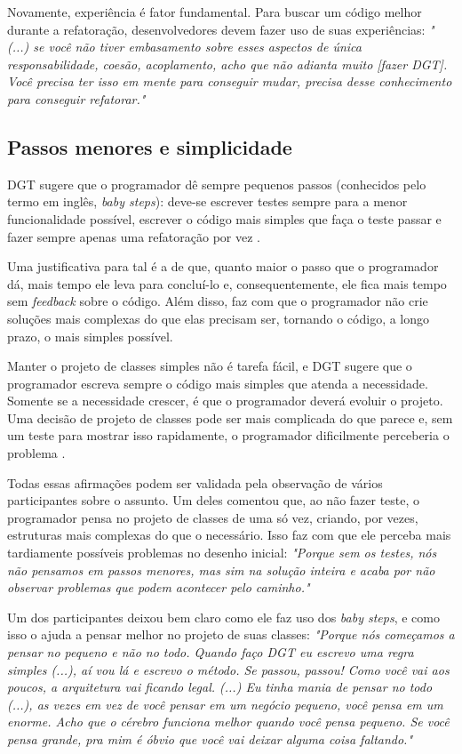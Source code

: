 Novamente, experiência é fator fundamental. Para buscar um código melhor durante a refatoração,
desenvolvedores devem fazer uso de suas experiências:
\textit{"(...) se você não tiver embasamento sobre esses aspectos de única responsabilidade,
coesão, acoplamento, acho que não adianta muito [fazer DGT]. Você precisa ter isso em mente
para conseguir mudar, precisa desse conhecimento para conseguir refatorar."}

\subsection{Passos menores e simplicidade}

DGT sugere que o programador dê sempre pequenos passos (conhecidos pelo termo em
inglês, \textit{baby steps}): deve-se escrever testes sempre para a menor
funcionalidade possível, escrever o código mais simples que faça o teste passar
e fazer sempre apenas uma refatoração por vez \cite{TDDByExample}.

Uma justificativa para tal é a de que, quanto maior o passo que o programador dá, mais
tempo ele leva para concluí-lo e, consequentemente, ele fica mais tempo
sem \textit{feedback} sobre o código. Além disso, faz com que o programador não crie
soluções mais complexas do que elas precisam ser, tornando o código, a longo
prazo, o mais simples possível.

Manter o projeto de classes simples não é tarefa fácil, e DGT sugere que o programador
escreva sempre o código mais simples que atenda a necessidade. Somente se a
necessidade crescer, é que o programador deverá evoluir o projeto. Uma decisão de
projeto de classes pode ser mais complicada do que parece e, sem um teste para mostrar isso
rapidamente, o programador dificilmente perceberia o problema \cite{aim-fire}.

Todas essas afirmações podem ser validada pela observação de vários participantes sobre o assunto.
Um deles comentou que,
ao não fazer teste, o programador pensa no projeto de classes de uma só vez, criando, por vezes,
estruturas mais complexas do que o necessário. Isso faz com que ele perceba mais tardiamente
possíveis problemas no desenho inicial:
\textit{"Porque sem os testes, nós não pensamos em passos menores, mas sim na solução inteira
e acaba por não observar problemas que podem acontecer pelo caminho."}

Um dos participantes deixou bem claro como ele faz uso dos \textit{baby steps}, e como
isso o ajuda a pensar melhor no projeto de suas classes:
\textit{"Porque nós começamos a pensar no pequeno e não no todo. Quando faço DGT eu escrevo
uma regra simples (...), aí vou lá e escrevo o método. Se passou, passou! Como você vai aos poucos,
a arquitetura vai ficando legal. (...) Eu tinha mania de pensar no todo (...), as vezes
em vez de você pensar em um negócio pequeno, você pensa em um enorme. Acho que o cérebro funciona
melhor quando você pensa pequeno. Se você pensa grande, pra mim é óbvio que você vai deixar
alguma coisa faltando."}

